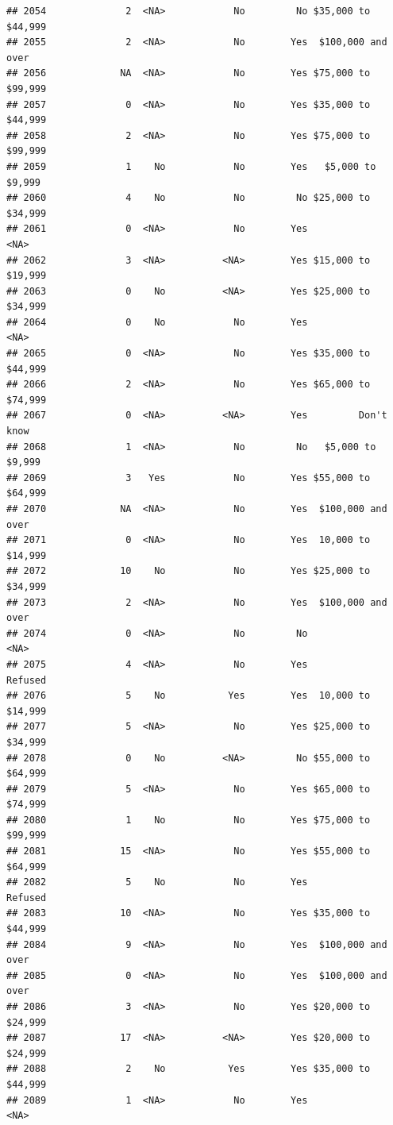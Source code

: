 \documentclass[man]{apa6}
\begin{document}
\begin{verbatim}
## 2054              2  <NA>            No         No $35,000 to $44,999
## 2055              2  <NA>            No        Yes  $100,000 and over
## 2056             NA  <NA>            No        Yes $75,000 to $99,999
## 2057              0  <NA>            No        Yes $35,000 to $44,999
## 2058              2  <NA>            No        Yes $75,000 to $99,999
## 2059              1    No            No        Yes   $5,000 to $9,999
## 2060              4    No            No         No $25,000 to $34,999
## 2061              0  <NA>            No        Yes               <NA>
## 2062              3  <NA>          <NA>        Yes $15,000 to $19,999
## 2063              0    No          <NA>        Yes $25,000 to $34,999
## 2064              0    No            No        Yes               <NA>
## 2065              0  <NA>            No        Yes $35,000 to $44,999
## 2066              2  <NA>            No        Yes $65,000 to $74,999
## 2067              0  <NA>          <NA>        Yes         Don't know
## 2068              1  <NA>            No         No   $5,000 to $9,999
## 2069              3   Yes            No        Yes $55,000 to $64,999
## 2070             NA  <NA>            No        Yes  $100,000 and over
## 2071              0  <NA>            No        Yes  10,000 to $14,999
## 2072             10    No            No        Yes $25,000 to $34,999
## 2073              2  <NA>            No        Yes  $100,000 and over
## 2074              0  <NA>            No         No               <NA>
## 2075              4  <NA>            No        Yes            Refused
## 2076              5    No           Yes        Yes  10,000 to $14,999
## 2077              5  <NA>            No        Yes $25,000 to $34,999
## 2078              0    No          <NA>         No $55,000 to $64,999
## 2079              5  <NA>            No        Yes $65,000 to $74,999
## 2080              1    No            No        Yes $75,000 to $99,999
## 2081             15  <NA>            No        Yes $55,000 to $64,999
## 2082              5    No            No        Yes            Refused
## 2083             10  <NA>            No        Yes $35,000 to $44,999
## 2084              9  <NA>            No        Yes  $100,000 and over
## 2085              0  <NA>            No        Yes  $100,000 and over
## 2086              3  <NA>            No        Yes $20,000 to $24,999
## 2087             17  <NA>          <NA>        Yes $20,000 to $24,999
## 2088              2    No           Yes        Yes $35,000 to $44,999
## 2089              1  <NA>            No        Yes               <NA>

\end{verbatim}
\end{document}
